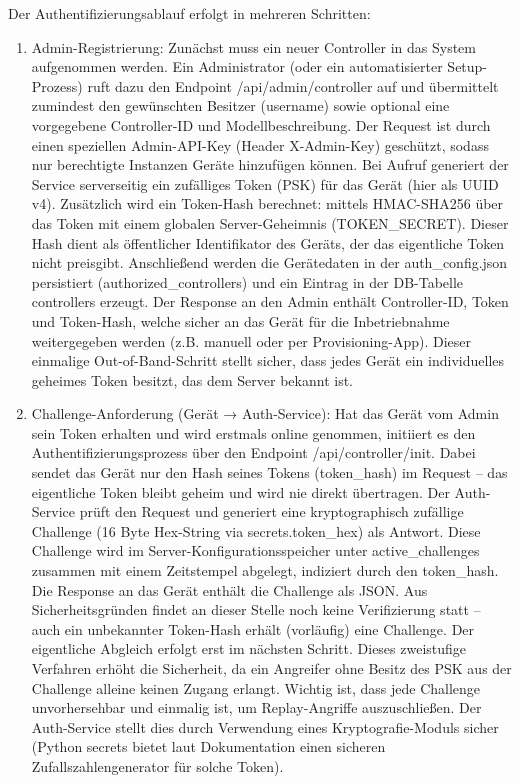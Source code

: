 Der Authentifizierungsablauf erfolgt in mehreren Schritten:
\begin{enumerate}
    \item Admin-Registrierung: Zunächst muss ein neuer Controller in das System aufgenommen werden. Ein Administrator (oder ein automatisierter Setup-Prozess) ruft dazu den Endpoint /api/admin/controller auf und übermittelt zumindest den gewünschten Besitzer (username) sowie optional eine vorgegebene Controller-ID und Modellbeschreibung. Der Request ist durch einen speziellen Admin-API-Key (Header X-Admin-Key) geschützt, sodass nur berechtigte Instanzen Geräte hinzufügen können. Bei Aufruf generiert der Service serverseitig ein zufälliges Token (PSK) für das Gerät (hier als UUID v4). Zusätzlich wird ein Token-Hash berechnet: mittels HMAC-SHA256 über das Token mit einem globalen Server-Geheimnis (TOKEN\_SECRET). Dieser Hash dient als öffentlicher Identifikator des Geräts, der das eigentliche Token nicht preisgibt. Anschließend werden die Gerätedaten in der auth\_config.json persistiert (authorized\_controllers) und ein Eintrag in der DB-Tabelle controllers erzeugt. Der Response an den Admin enthält Controller-ID, Token und Token-Hash, welche sicher an das Gerät für die Inbetriebnahme weitergegeben werden (z.B. manuell oder per Provisioning-App). Dieser einmalige Out-of-Band-Schritt stellt sicher, dass jedes Gerät ein individuelles geheimes Token besitzt, das dem Server bekannt ist.
    \item Challenge-Anforderung (Gerät → Auth-Service): Hat das Gerät vom Admin sein Token erhalten und wird erstmals online genommen, initiiert es den Authentifizierungsprozess über den Endpoint /api/controller/init. Dabei sendet das Gerät nur den Hash seines Tokens (token\_hash) im Request – das eigentliche Token bleibt geheim und wird nie direkt übertragen. Der Auth-Service prüft den Request und generiert eine kryptographisch zufällige Challenge (16 Byte Hex-String via secrets.token\_hex) als Antwort. Diese Challenge wird im Server-Konfigurationsspeicher unter active\_challenges zusammen mit einem Zeitstempel abgelegt, indiziert durch den token\_hash. Die Response an das Gerät enthält die Challenge als JSON. Aus Sicherheitsgründen findet an dieser Stelle noch keine Verifizierung statt – auch ein unbekannter Token-Hash erhält (vorläufig) eine Challenge. Der eigentliche Abgleich erfolgt erst im nächsten Schritt. Dieses zweistufige Verfahren erhöht die Sicherheit, da ein Angreifer ohne Besitz des PSK aus der Challenge alleine keinen Zugang erlangt. Wichtig ist, dass jede Challenge unvorhersehbar und einmalig ist, um Replay-Angriffe auszuschließen. Der Auth-Service stellt dies durch Verwendung eines Kryptografie-Moduls sicher (Python secrets \cite{pythonSecrets} bietet laut Dokumentation einen sicheren Zufallszahlengenerator für solche Token).

\end{enumerate}
